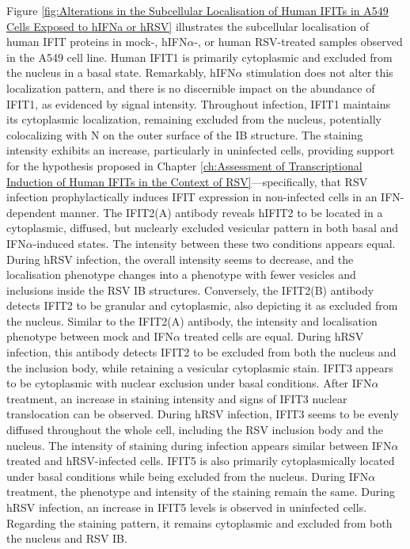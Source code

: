 Figure \ref{fig:Alterations in the Subcellular Localisation of Human IFITs in A549 Cells Exposed to hIFNa or hRSV} illustrates the subcellular localisation of human IFIT proteins in mock-, hIFN\(\alpha\)-, or human RSV-treated samples observed in the A549 cell line. Human IFIT1 is primarily cytoplasmic and excluded from the nucleus in a basal state. Remarkably, hIFN\(\alpha\) stimulation does not alter this localization pattern, and there is no discernible impact on the abundance of IFIT1, as evidenced by signal intensity. Throughout infection, IFIT1 maintains its cytoplasmic localization, remaining excluded from the nucleus, potentially colocalizing with N on the outer surface of the IB structure. The staining intensity exhibits an increase, particularly in uninfected cells, providing support for the hypothesis proposed in Chapter \ref{ch:Assessment of Transcriptional Induction of Human IFITs in the Context of RSV}—specifically, that RSV infection prophylactically induces IFIT expression in non-infected cells in an IFN-dependent manner. The IFIT2(A) antibody reveals hIFIT2 to be located in a cytoplasmic, diffused, but nuclearly excluded vesicular pattern in both basal and IFN\(\alpha\)-induced states. The intensity between these two conditions appears equal. During hRSV infection, the overall intensity seems to decrease, and the localisation phenotype changes into a phenotype with fewer vesicles and inclusions inside the RSV IB structures. Conversely, the IFIT2(B) antibody detects IFIT2 to be granular and cytoplasmic, also depicting it as excluded from the nucleus. Similar to the IFIT2(A) antibody, the intensity and localisation phenotype between mock and IFN\(\alpha\) treated cells are equal. During hRSV infection, this antibody detects IFIT2 to be excluded from both the nucleus and the inclusion body, while retaining a vesicular cytoplasmic stain. IFIT3 appears to be cytoplasmic with nuclear exclusion under basal conditions. After IFN\(\alpha\) treatment, an increase in staining intensity and signs of IFIT3 nuclear translocation can be observed. During hRSV infection, IFIT3 seems to be evenly diffused throughout the whole cell, including the RSV inclusion body and the nucleus. The intensity of staining during infection appears similar between IFN\(\alpha\) treated and hRSV-infected cells. IFIT5 is also primarily cytoplasmically located under basal conditions while being excluded from the nucleus. During IFN\(\alpha\) treatment, the phenotype and intensity of the staining remain the same. During hRSV infection, an increase in IFIT5 levels is observed in uninfected cells. Regarding the staining pattern, it remains cytoplasmic and excluded from both the nucleus and RSV IB.

